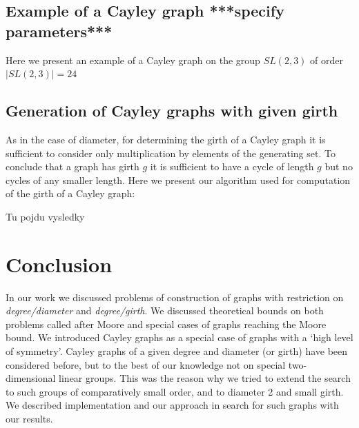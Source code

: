 \documentclass[a4paper,12pt,oneside]{report}%
\begin{document}
\subsection{Example of a Cayley graph ***specify parameters***}
Here we present an example of a Cayley graph on the group $SL(2,3)$ of order $|SL(2,3)|=24$

\subsection{Generation of Cayley graphs with given girth}

As in the case of diameter, for determining the girth of a Cayley graph it is sufficient to consider only multiplication by elements of the generating set. 
To conclude that a graph has girth $g$ it is sufficient to have a cycle of length $g$ but no cycles of any smaller length. Here we present our algorithm used for computation of  the girth of a Cayley graph:



Tu pojdu vysledky

\newpage

\section{Conclusion}

In our work we discussed problems of construction of graphs with restriction on {\em degree/diameter} and {\em degree/girth}. We discussed theoretical bounds on both problems called after Moore and special cases of graphs reaching the Moore bound. We introduced Cayley graphs as a special case of graphs with a `high level of symmetry'. Cayley graphs of a given degree and diameter (or girth) have been considered before, but to the best of our knowledge not on special two-dimensional linear groups. This was the reason why we tried to extend the search to such groups of comparatively small order, and to diameter 2 and small girth. We described implementation and our approach in search for such graphs with our results.
\end{document}
